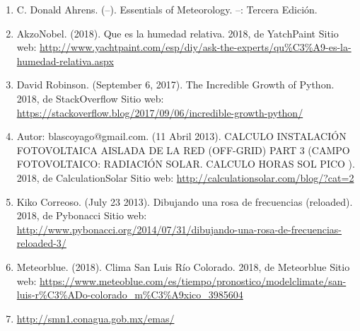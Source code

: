 \documentclass[12pt]{article}
\begin{document}
\begin{enumerate} [\hspace{16pt} 1.]
		\item C. Donald Ahrens. (--). Essentials of Meteorology. --: Tercera Edici\'on.

		\item AkzoNobel. (2018). Que es la humedad relativa. 2018, de YatchPaint Sitio web: \url{http://www.yachtpaint.com/esp/diy/ask-the-experts/qu%C3%A9-es-la-humedad-relativa.aspx}

        \item David Robinson. (September 6, 2017). The Incredible Growth of Python. 2018, de StackOverflow Sitio web: \url{https://stackoverflow.blog/2017/09/06/incredible-growth-python/}

        \item Autor: blascoyago@gmail.com. (11 Abril 2013). CALCULO INSTALACIÓN FOTOVOLTAICA AISLADA DE LA RED (OFF-GRID) PART 3 (CAMPO FOTOVOLTAICO: RADIACIÓN SOLAR. CALCULO HORAS SOL PICO ). 2018, de CalculationSolar Sitio web: \url{http://calculationsolar.com/blog/?cat=2}
        
        \item Kiko Correoso. (July 23 2013). Dibujando una rosa de frecuencias (reloaded). 2018, de Pybonacci Sitio web: \url{http://www.pybonacci.org/2014/07/31/dibujando-una-rosa-de-frecuencias-reloaded-3/}
        \item Meteorblue. (2018). Clima San Luis Río Colorado. 2018, de Meteorblue Sitio web: \url{https://www.meteoblue.com/es/tiempo/pronostico/modelclimate/san-luis-r%C3%ADo-colorado_m%C3%A9xico_3985604}
        \item \url{http://smn1.conagua.gob.mx/emas/}
\end{enumerate}

\end{document}
